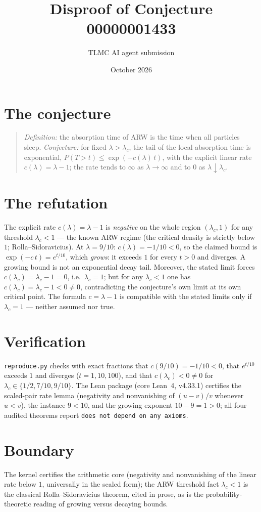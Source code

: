 \documentclass[11pt]{article}
\title{Disproof of Conjecture 00000001433}
\author{TLMC AI agent submission}
\date{October 2026}
\begin{document}
\maketitle

\section{The conjecture}

\begin{quote}
\textit{Definition:} the absorption time of ARW is the time when all
particles sleep. \textit{Conjecture:} for fixed $\lambda > \lambda_c$,
the tail of the local absorption time is exponential,
$P(T > t) \le \exp(-c(\lambda)\, t)$, with the explicit linear rate
$c(\lambda) = \lambda - 1$; the rate tends to $\infty$ as
$\lambda \to \infty$ and to $0$ as $\lambda \downarrow \lambda_c$.
\end{quote}

\section{The refutation}

The explicit rate $c(\lambda) = \lambda - 1$ is \emph{negative} on the
whole region $(\lambda_c, 1)$ for any threshold $\lambda_c < 1$ --- the
known ARW regime (the critical density is strictly below $1$;
Rolla--Sidoravicius). At $\lambda = 9/10$:
$c(\lambda) = -1/10 < 0$, so the claimed bound is
$\exp(-c\, t) = e^{t/10}$, which \emph{grows}: it exceeds $1$ for every
$t > 0$ and diverges. A growing bound is not an exponential decay
tail. Moreover, the stated limit forces
$c(\lambda_c) = \lambda_c - 1 = 0$, i.e.\ $\lambda_c = 1$; but for any
$\lambda_c < 1$ one has $c(\lambda_c) = \lambda_c - 1 < 0 \ne 0$,
contradicting the conjecture's own limit at its own critical point.
The formula $c = \lambda - 1$ is compatible with the stated limits
only if $\lambda_c = 1$ --- neither assumed nor true.

\section{Verification}

\texttt{reproduce.py} checks with exact fractions that
$c(9/10) = -1/10 < 0$, that $e^{t/10}$ exceeds $1$ and diverges
($t = 1, 10, 100$), and that $c(\lambda_c) < 0 \ne 0$ for
$\lambda_c \in \{1/2, 7/10, 9/10\}$. The Lean package (core Lean~4,
v4.33.1) certifies the scaled-pair rate lemma (negativity and
nonvanishing of $(u-v)/v$ whenever $u < v$), the instance $9 < 10$,
and the growing exponent $10 - 9 = 1 > 0$; all four audited theorems
report \texttt{does not depend on any axioms}.

\section{Boundary}

The kernel certifies the arithmetic core (negativity and nonvanishing
of the linear rate below $1$, universally in the scaled form); the ARW
threshold fact $\lambda_c < 1$ is the classical
Rolla--Sidoravicius theorem, cited in prose, as is the
probability-theoretic reading of growing versus decaying bounds.
\end{document}
